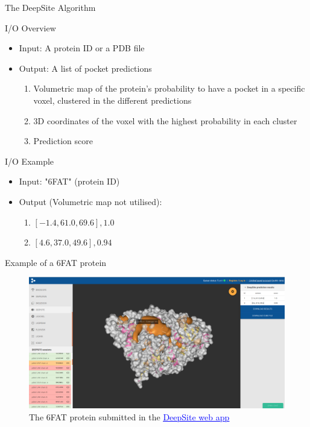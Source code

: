 \documentclass{beamer}
\newcommand{\link}[2]{\href{#1}{\textcolor{blue}{\underline{#2}}}}
\begin{document}
\begin{frame}{The DeepSite Algorithm}
  \begin{block}{I/O Overview}
    \begin{itemize}
      \item Input: A protein ID or a PDB file
      \item Output: A list of pocket predictions
      \begin{enumerate}
        \item Volumetric map of the protein's probability to have a pocket in a specific voxel, clustered in the different predictions
        \item 3D coordinates of the voxel with the highest probability in each cluster
        \item Prediction score
      \end{enumerate}
    \end{itemize}
  \end{block}
  \begin{block}{I/O Example}
    \begin{itemize}
      \item Input: "6FAT" (protein ID)
      \item Output (Volumetric map not utilised):
      \begin{enumerate}
        \item $\left[-1.4, 61.0, 69.6\right], 1.0$
        \item $\left[4.6, 37.0, 49.6\right], 0.94$
      \end{enumerate}
    \end{itemize}
  \end{block}
\end{frame}

\begin{frame}{Example of a 6FAT protein}
  \begin{figure}[h]
    \includegraphics[width=1\textwidth]{deepsite_6fat_result}
    \caption{The 6FAT protein submitted in the \link{https://www.playmolecule.com/deepsite/}{DeepSite web app}}
  \end{figure}
\end{frame}
\end{document}

